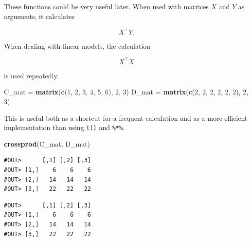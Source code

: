 \documentclass[]{book}
\newenvironment{Shaded}{\begin{snugshade}}{\end{snugshade}}
\newcommand{\KeywordTok}[1]{\textcolor[rgb]{0.13,0.29,0.53}{\textbf{#1}}}
\newcommand{\DecValTok}[1]{\textcolor[rgb]{0.00,0.00,0.81}{#1}}
\newcommand{\StringTok}[1]{\textcolor[rgb]{0.31,0.60,0.02}{#1}}
\newcommand{\OperatorTok}[1]{\textcolor[rgb]{0.81,0.36,0.00}{\textbf{#1}}}
\newcommand{\NormalTok}[1]{#1}
\theoremstyle{definition}
\theoremstyle{definition}
\theoremstyle{definition}
\theoremstyle{remark}
\begin{document}
These functions could be very useful later. When used with matrices
\(X\) and \(Y\) as arguments, it calculates

\[
X^\top Y.
\]

When dealing with linear models, the calculation

\[
X^\top X
\]

is used repeatedly.

\begin{Shaded}
\begin{Highlighting}[]
\NormalTok{C_mat =}\StringTok{ }\KeywordTok{matrix}\NormalTok{(}\KeywordTok{c}\NormalTok{(}\DecValTok{1}\NormalTok{, }\DecValTok{2}\NormalTok{, }\DecValTok{3}\NormalTok{, }\DecValTok{4}\NormalTok{, }\DecValTok{5}\NormalTok{, }\DecValTok{6}\NormalTok{), }\DecValTok{2}\NormalTok{, }\DecValTok{3}\NormalTok{)}
\NormalTok{D_mat =}\StringTok{ }\KeywordTok{matrix}\NormalTok{(}\KeywordTok{c}\NormalTok{(}\DecValTok{2}\NormalTok{, }\DecValTok{2}\NormalTok{, }\DecValTok{2}\NormalTok{, }\DecValTok{2}\NormalTok{, }\DecValTok{2}\NormalTok{, }\DecValTok{2}\NormalTok{), }\DecValTok{2}\NormalTok{, }\DecValTok{3}\NormalTok{)}
\end{Highlighting}
\end{Shaded}

This is useful both as a shortcut for a frequent calculation and as a
more efficient implementation than using \texttt{t()} and
\texttt{\%*\%}.

\begin{Shaded}
\begin{Highlighting}[]
\KeywordTok{crossprod}\NormalTok{(C_mat, D_mat)}
\end{Highlighting}
\end{Shaded}

\begin{verbatim}
#OUT>      [,1] [,2] [,3]
#OUT> [1,]    6    6    6
#OUT> [2,]   14   14   14
#OUT> [3,]   22   22   22
\end{verbatim}

\begin{Shaded}
\end{Shaded}

\begin{verbatim}
#OUT>      [,1] [,2] [,3]
#OUT> [1,]    6    6    6
#OUT> [2,]   14   14   14
#OUT> [3,]   22   22   22
\end{verbatim}
\end{document}
